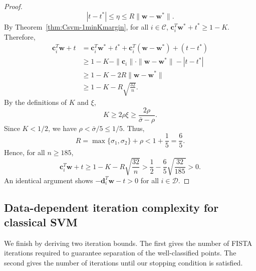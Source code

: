 \documentclass[twoside,11pt]{article}
\renewcommand{\c}{\bm{c}}
\renewcommand{\d}{\bm{d}}
\newcommand\w{\bm{w}}
\newcommand\CC{\mathcal{C}}
\newcommand\DD{\mathcal{D}}
\begin{document}
\begin{proof}
    \[
        |t - t^*| \leq \eta \leq R\|\w - \w^*\|.
    \]
    By Theorem~\ref{thm:Csvm-1minKmargin}, for all $i \in \CC$, $\c_i^T\w^* + t^* \geq 1 - K$. Therefore,
    \begin{align*}
        \c_i^T\w + t &= \c_i^T\w^* + t^* + \c_i^T(\w - \w^*) + (t - t^*)\\
        &\geq 1 - K - \|\c_i\|\cdot \|\w - \w^*\| - |t - t^*|\\
        &\geq 1 - K - 2R\|\w - \w^*\|\\
        &\geq 1 - K - R\sqrt{\frac{32}{n}}.
    \end{align*}
    By the definitions of $K$ and $\xi$,
    \[
        K \geq 2\rho\xi \geq \frac{2\rho}{\bar{\sigma} - \rho}.
    \]
    Since $K < 1/2$, we have $\rho < \bar{\sigma}/5 \leq 1/5$. Thus,
    \[
        R = \max\{\sigma_1,\sigma_2\} + \rho < 1 + \frac{1}{5} = \frac{6}{5}.
    \]
    Hence, for all $n \geq 185$,
    \[
        \c_i^T\w + t \geq 1 - K - R\sqrt{\frac{32}{n}} > \frac{1}{2} - \frac{6}{5}\sqrt{\frac{32}{185}} > 0.
    \]
    An identical argument shows $-\d_i^T\w - t > 0$ for all $i \in \DD$.
\end{proof}

\subsection{Data-dependent iteration complexity for classical SVM} \label{app:ddc_iters}
We finish by deriving two iteration bounds. The first gives the number of FISTA iterations required to guarantee separation of the well-classified points. The second gives the number of iterations until our stopping condition is satisfied.
\end{document}
